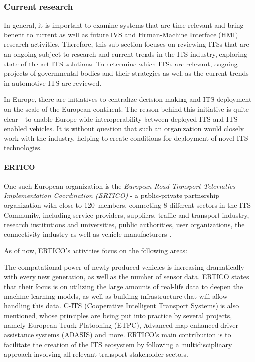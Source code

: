 \documentclass[0main.tex]{subfiles}
\begin{document}
\subsubsection{Current research}\label{sec-research}

In general, it is important to examine systems that are time-relevant and bring benefit to
current as well as future IVS and Human-Machine Interface (HMI) research activities. Therefore,
this sub-section focuses on reviewing ITSs that are an ongoing subject to research and
current trends in the ITS industry, exploring state-of-the-art ITS solutions. To determine which ITSs
are relevant, ongoing projects of governmental bodies and their
strategies as well as the current trends in automotive ITS are reviewed.

In Europe, there are initiatives to centralize decision-making and ITS deployment on the scale of 
the European continent. The reason behind this initiative is quite clear - to enable Europe-wide 
interoperability between deployed ITS and ITS-enabled vehicles. It is without question that 
such an organization would closely work with the industry, helping to create conditions for
deployment of novel ITS technologies.

\paragraph{ERTICO}

One such European organization is the \emph{European Road Transport Telematics
Implementation Coordination (ERTICO)} - a public-private partnership organization
with close to 120~members, connecting 8 different sectors in the ITS Community, including
service providers, suppliers, traffic and transport industry, research institutions and
universities, public authorities, user organizations, the connectivity industry as well as
vehicle manufacturers \cite{ertico}.

As of now, ERTICO's activities focus on the following areas:

The computational power of newly-produced vehicles is increasing dramatically with every 
new generation, as well as the number of sensor data. ERTICO states that their focus is on utilizing 
the large amounts of real-life data to deepen the machine learning models, as well as building 
infrastructure that will allow handling this data. C-ITS (Cooperative Intelligent Transport
Systems) is also mentioned, whose principles are being put into practice by several projects, 
namely European Truck Platooning (ETPC), Advanced map-enhanced driver assistance systems (ADASIS) and 
more. ERTICO's main contribution is to facilitate the creation of the ITS ecosystem by following a
multidisciplinary approach involving all relevant transport stakeholder sectors.
\end{document}
